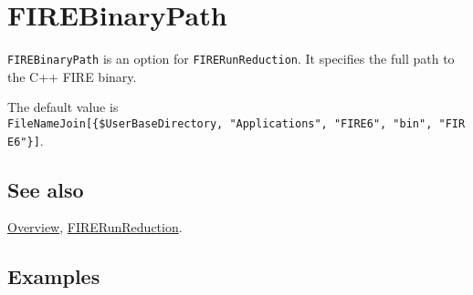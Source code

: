 \documentclass[../FeynHelpersManual.tex]{subfiles}
\begin{document}
\hypertarget{firebinarypath}{
\section{FIREBinaryPath}\label{firebinarypath}}

\texttt{FIREBinaryPath} is an option for \texttt{FIRERunReduction}. It
specifies the full path to the C++ FIRE binary.

The default value is
\texttt{FileNameJoin[\allowbreak{}\{\allowbreak{}\$UserBaseDirectory,\ \allowbreak{}"Applications",\ \allowbreak{}"FIRE6",\ \allowbreak{}"bin",\ \allowbreak{}"FIRE6"\}]}.

\subsection{See also}

\hyperlink{toc}{Overview},
\hyperlink{firerunreduction}{FIRERunReduction}.

\subsection{Examples}
\end{document}
